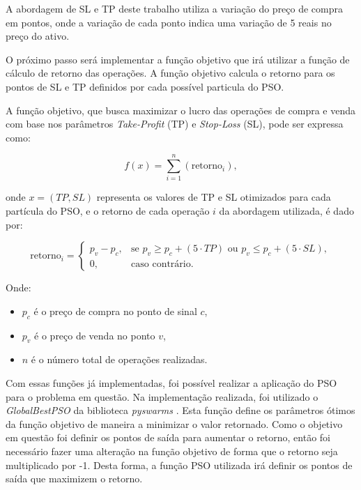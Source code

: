 \documentclass{iftex2024}
\begin{document}
A abordagem de SL e TP deste trabalho utiliza a variação do
preço de compra em pontos, onde a variação de cada ponto indica uma variação de 5 reais
no preço do ativo.

O próximo passo será implementar a função objetivo que irá utilizar a função
de cálculo de retorno das operações. A função objetivo calcula o retorno para os pontos
de SL e TP definidos por cada possível particula do PSO.

A função objetivo, que busca maximizar o lucro das operações de compra e venda com base nos parâmetros \textit{Take-Profit} (TP) e \textit{Stop-Loss} (SL), pode ser expressa como:

\begin{equation}
f(x) = \sum_{i=1}^{n} \left( \text{retorno}_{i} \right),
\end{equation}

onde \( x = (TP, SL) \) representa os valores de TP e SL otimizados para cada 
partícula do PSO, e o retorno de cada operação \( i \) da abordagem utilizada, é dado por:

\begin{equation}
\text{retorno}_{i} =
\begin{cases} 
p_{v} - p_{c}, & \text{se } p_{v} \geq p_{c} + (5 \cdot TP) \text{ ou } p_{v} \leq p_{c} + (5 \cdot SL), \\
0, & \text{caso contrário}.
\end{cases}
\end{equation}

Onde:
\begin{itemize}
    \item \( p_{c} \) é o preço de compra no ponto de sinal \( c \),
    \item \( p_{v} \) é o preço de venda no ponto \( v \),
    \item \( n \) é o número total de operações realizadas.
\end{itemize}

Com essas funções já implementadas, foi possível realizar a aplicação do PSO
para o problema em questão. Na implementação realizada, foi utilizado o \textit{GlobalBestPSO}
da biblioteca \textit{pyswarms} \cite{miranda2018pyswarms}. Esta função define os parâmetros ótimos da função objetivo de
maneira a minimizar o valor retornado. Como o objetivo em questão foi definir os pontos de
saída para aumentar o retorno, então foi necessário fazer uma alteração na função objetivo
de forma que o retorno seja multiplicado por -1. Desta forma, a função PSO utilizada irá
definir os pontos de saída que maximizem o retorno.
\end{document}
